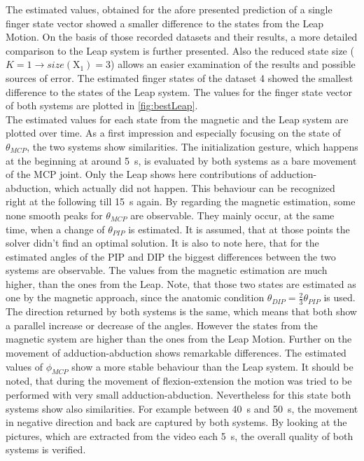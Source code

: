 The estimated values, obtained for the afore presented prediction of a single finger state vector showed a smaller difference to the states from the Leap Motion. On the basis of those recorded datasets and their results, a more detailed comparison to the Leap system is further presented. Also the reduced state size ($ K = 1 \rightarrow size(\mathrm{X}_{1}) = 3 $) allows an easier examination of the results and possible sources of error. The estimated finger states of the dataset 4 showed the smallest difference to the states of the Leap system. The values for the finger state vector of both systems are plotted in \ref{fig:bestLeap}.\\ 
The estimated values for each state from the magnetic and the Leap system are plotted over time. As a first impression and especially focusing on the state of $ \theta_{MCP} $, the two systems show similarities. The initialization gesture, which happens at the beginning at around \SI{5}{\second}, is evaluated by both systems as a bare movement of the \ac{MCP} joint. Only the Leap shows here contributions of adduction-abduction, which actually did not happen. This behaviour can be recognized right at the following till \SI{15}{\second} again. By regarding the magnetic estimation, some none smooth peaks for $ \theta_{MCP} $ are observable. They mainly occur, at the same time, when a change of $ \theta_{PIP} $ is estimated. It is assumed, that at those points the solver didn't find an optimal solution. It is also to note here, that for the estimated angles of the \ac{PIP} and \ac{DIP} the biggest differences between the two systems are observable. The values from the magnetic estimation are much higher, than the ones from the Leap. Note, that those two states are estimated as one by the magnetic approach, since the anatomic condition $ \theta_{DIP} = \frac{2}{3} \theta_{PIP} $ is used. The direction returned by both systems is the same, which means that both show a parallel increase or decrease of the angles. However the states from the magnetic system are higher than the ones from the Leap Motion. Further on the movement of adduction-abduction shows remarkable differences. The estimated values of $ \phi_{MCP} $ show a more stable behaviour than the Leap system. It should be noted, that during the movement of flexion-extension the motion was tried to be performed with very small adduction-abduction. Nevertheless for this state both systems show also similarities. For example between \SI{40}{\second} and \SI{50}{\second}, the movement in negative direction and back are captured by both systems. By looking at the pictures, which are extracted from the video each \SI{5}{\second}, the overall quality of both systems is verified.
